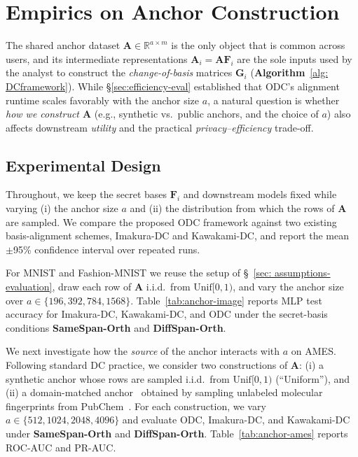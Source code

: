 \documentclass[final,3p,times]{elsarticle}
\theoremstyle{plain}
\newcommand{\matr}[1]{\bm{#1}}        %
\begin{document}
\section{Empirics on Anchor Construction}
\label{sec:anchor-construction}

The shared anchor dataset $\matr{A}\in\mathbb{R}^{a\times m}$ is the only object that is common across users, and its intermediate representations $\matr{A}_i=\matr{A}\matr{F}_i$ are the sole inputs used by the analyst to construct the \emph{change-of-basis} matrices $\matr{G}_i$ (\textbf{Algorithm}~\ref{alg: DCframework}). While \S\ref{sec:efficiency-eval} established that ODC's alignment runtime scales favorably with the anchor size $a$, a natural question is whether \emph{how we construct $\matr{A}$} (e.g., synthetic vs.\ public anchors, and the choice of $a$) also affects downstream \emph{utility} and the practical \emph{privacy--efficiency} trade-off.

\subsection{Experimental Design}
Throughout, we keep the secret bases $\matr{F}_i$ and downstream models fixed while varying (i) the anchor size $a$ and (ii) the distribution from which the rows of $\matr{A}$ are sampled. We compare the proposed ODC framework against two existing basis-alignment schemes, Imakura-DC and Kawakami-DC, and report the mean $\pm$95\% confidence interval over repeated runs.

For MNIST and Fashion-MNIST we reuse the setup of \S~\ref{sec: assumptions-evaluation}, draw each row of $\matr{A}$ i.i.d.\ from $\mathrm{Unif}[0,1)$, and vary the anchor size over $a\in\{196,392,784,1568\}$. Table~\ref{tab:anchor-image} reports MLP test accuracy for Imakura-DC, Kawakami-DC, and ODC under the secret-basis conditions \textbf{SameSpan-Orth} and \textbf{DiffSpan-Orth}.

We next investigate how the \emph{source} of the anchor interacts with $a$ on AMES. Following standard DC practice, we consider two constructions of $\matr{A}$: (i) a synthetic anchor whose rows are sampled i.i.d.\ from $\mathrm{Unif}[0,1)$ (``Uniform''), and (ii) a domain-matched anchor~\cite{DCnoniid} obtained by sampling unlabeled molecular fingerprints from PubChem~\cite{PubChem}. For each construction, we vary $a\in\{512,1024,2048,4096\}$ and evaluate ODC, Imakura-DC, and Kawakami-DC under \textbf{SameSpan-Orth} and \textbf{DiffSpan-Orth}. Table~\ref{tab:anchor-ames} reports ROC-AUC and PR-AUC.
\end{document}
